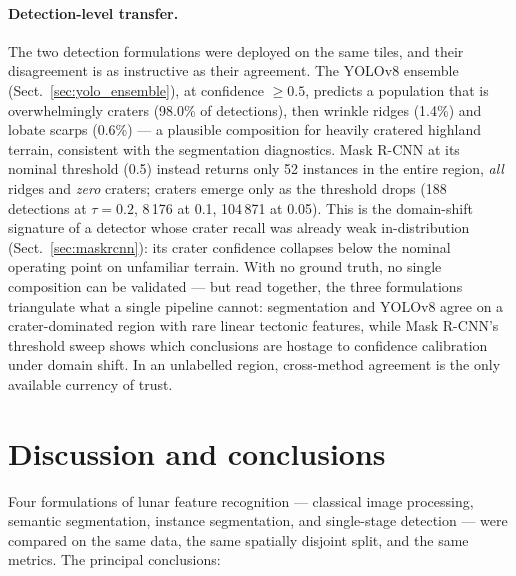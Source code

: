 \documentclass{aa}
\begin{document}
\paragraph{Detection-level transfer.}
The two detection formulations were deployed on the same tiles, and their disagreement is as instructive as their agreement. The YOLOv8 ensemble (Sect.~\ref{sec:yolo_ensemble}), at confidence $\geq0.5$, predicts a population that is overwhelmingly craters (98.0\% of detections), then wrinkle ridges (1.4\%) and lobate scarps (0.6\%) --- a plausible composition for heavily cratered highland terrain, consistent with the segmentation diagnostics. Mask R-CNN at its nominal threshold (0.5) instead returns only 52 instances in the entire region, \emph{all} ridges and \emph{zero} craters; craters emerge only as the threshold drops (188 detections at $\tau=0.2$, 8\,176 at 0.1, 104\,871 at 0.05). This is the domain-shift signature of a detector whose crater recall was already weak in-distribution (Sect.~\ref{sec:maskrcnn}): its crater confidence collapses below the nominal operating point on unfamiliar terrain. With no ground truth, no single composition can be validated --- but read together, the three formulations triangulate what a single pipeline cannot: segmentation and YOLOv8 agree on a crater-dominated region with rare linear tectonic features, while Mask R-CNN's threshold sweep shows which conclusions are hostage to confidence calibration under domain shift. In an unlabelled region, cross-method agreement is the only available currency of trust.


\section{Discussion and conclusions}
\label{sec:conclusions_global}

Four formulations of lunar feature recognition --- classical image processing, semantic segmentation, instance segmentation, and single-stage detection --- were compared on the same data, the same spatially disjoint split, and the same metrics. The principal conclusions:
\end{document}
